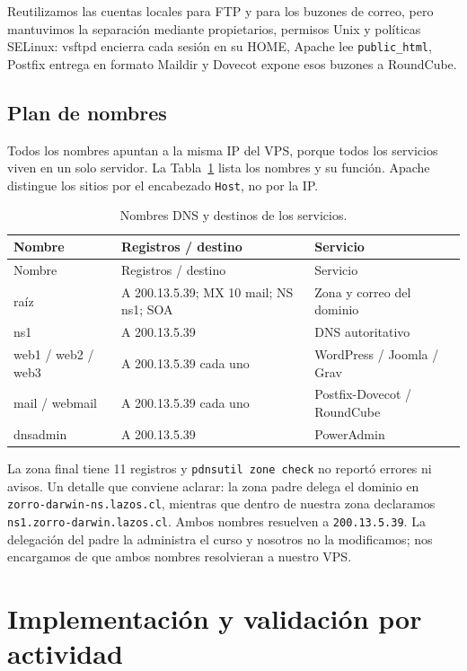 \documentclass[11pt,a4paper]{article}
\begin{document}
Reutilizamos las cuentas locales para FTP y para los buzones de correo, pero mantuvimos la separación mediante propietarios, permisos Unix y políticas SELinux: vsftpd encierra cada sesión en su HOME, Apache lee \texttt{public\_html}, Postfix entrega en formato Maildir y Dovecot expone esos buzones a RoundCube.

\subsection{Plan de nombres}
Todos los nombres apuntan a la misma IP del VPS, porque todos los servicios viven en un solo servidor. La Tabla~\ref{tab:nombres} lista los nombres y su función. Apache distingue los sitios por el encabezado \texttt{Host}, no por la IP.

\begin{longtable}{@{}p{3.1cm}p{4.6cm}p{5.0cm}@{}}
\caption{Nombres DNS y destinos de los servicios.}\label{tab:nombres}\\
\toprule Nombre & Registros / destino & Servicio \\
\midrule\endfirsthead
\toprule Nombre & Registros / destino & Servicio \\
\midrule\endhead
raíz & A 200.13.5.39; MX 10 mail; NS ns1; SOA & Zona y correo del dominio \\
ns1 & A 200.13.5.39 & DNS autoritativo \\
web1 / web2 / web3 & A 200.13.5.39 cada uno & WordPress / Joomla / Grav \\
mail / webmail & A 200.13.5.39 cada uno & Postfix-Dovecot / RoundCube \\
dnsadmin & A 200.13.5.39 & PowerAdmin \\
\bottomrule
\end{longtable}

La zona final tiene 11 registros y \texttt{pdnsutil zone check} no reportó errores ni avisos. Un detalle que conviene aclarar: la zona padre delega el dominio en \texttt{zorro-darwin-ns.lazos.cl}, mientras que dentro de nuestra zona declaramos \texttt{ns1.zorro-darwin.lazos.cl}. Ambos nombres resuelven a \texttt{200.13.5.39}. La delegación del padre la administra el curso y nosotros no la modificamos; nos encargamos de que ambos nombres resolvieran a nuestro VPS.

\section{Implementación y validación por actividad}
\end{document}
